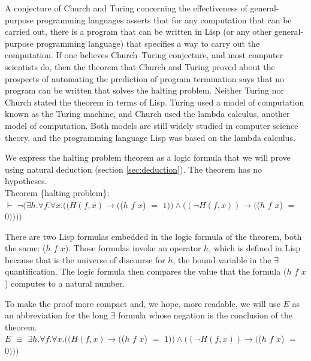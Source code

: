 \label{church-turing-hypothesis}A
conjecture of Church and Turing
concerning the effectiveness of general-purpose programming languages
asserts that for any computation that can be carried out, there is a program
that can be written in Lisp (or any other general-purpose programming language)
that specifies a way to carry out the computation.
If one believes Church--Turing conjecture, and most computer scientists do,
then the theorem that Church and Turing proved about the prospects of
automating the prediction of program termination
says that no program can be written that solves the halting problem.
Neither Turing nor Church stated the theorem in terms of Lisp.
Turing used a model of computation known as the Turing machine, and
Church used the lambda calculus, another model of computation.
Both models are still widely studied in computer science theory,
and the programming language Lisp
was based on the lambda calculus.

We express the halting problem
theorem as a logic formula that we will prove
using natural deduction (section \ref{sec:deduction}).
The theorem has no hypotheses.
\vspace{2mm}\\
\hspace*{5mm}Theorem \{halting problem\}:\\
\hspace*{1cm}$\vdash$ $\neg(\exists h. \forall f. \forall x.
((H(f, x) \rightarrow ($\textsf{($h$ $f$ $x$)} $=$ $1)) \wedge ((\neg H(f, x)) \rightarrow ($\textsf{($h$ $f$ $x$)} $=$ $0))))$
\vspace{2mm}

There are two Lisp formulas embedded in
the logic formula of the theorem, both the same:
\textsf{($h$ $f$ $x$)}.
Those formulas invoke an operator $h$, which is defined in Lisp because that is the universe
of discourse for $h$, the bound variable in the $\exists$ quantification.
The logic formula then compares the value that
the formula \textsf{($h$ $f$ $x$)} computes to a natural number.

To make the proof more compact and, we hope, more readable,
we will use $E$ as an abbreviation for the
long $\exists$ formula whose negation is the conclusion of the theorem.
\vspace{2mm}\\
\hspace*{5mm}$E$ $\equiv$ $\exists h. \forall f. \forall x.
((H(f, x) \rightarrow ($\textsf{($h$ $f$ $x$)} $=$ $1)) \wedge ((\neg H(f, x)) \rightarrow ($\textsf{($h$ $f$ $x$)} $=$ $0)))$
\vspace{2mm}

